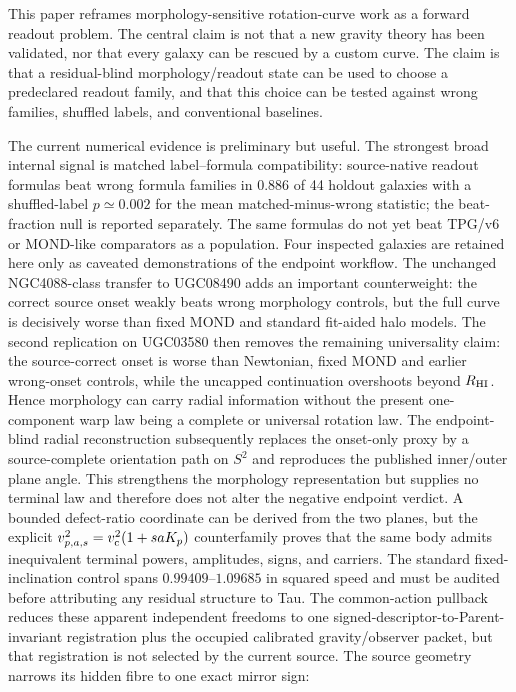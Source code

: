 \documentclass[11pt]{article}
\begin{document}
This paper reframes morphology-sensitive rotation-curve work as a forward
readout problem.  The central claim is not that a new gravity theory has been
validated, nor that every galaxy can be rescued by a custom curve.  The claim is
that a residual-blind morphology/readout state can be used to choose a
predeclared readout family, and that this choice can be tested against wrong
families, shuffled labels, and conventional baselines.

The current numerical evidence is preliminary but useful.  The strongest broad
internal signal is matched label--formula compatibility: source-native readout formulas beat wrong
formula families in \(0.886\) of 44 holdout galaxies with a shuffled-label
\(p\simeq0.002\) for the mean matched-minus-wrong statistic; the
beat-fraction null is reported separately.  The same formulas do not yet beat
TPG/v6 or MOND-like comparators as a population.  Four inspected galaxies are
retained here only as caveated demonstrations of the endpoint workflow.  The
unchanged NGC4088-class transfer to UGC08490 adds an important counterweight:
the correct source onset weakly beats wrong morphology controls, but the full
curve is decisively worse than fixed MOND and standard fit-aided halo models.
The second replication on UGC03580 then removes the remaining universality
claim: the source-correct onset is worse than Newtonian, fixed MOND and earlier
wrong-onset controls, while the uncapped continuation overshoots beyond
\(R_{\rm HI}\).  Hence morphology can carry radial information without the
present one-component warp law being a complete or universal rotation law.
The endpoint-blind radial reconstruction subsequently replaces the onset-only
proxy by a source-complete orientation path on \(S^2\) and reproduces the
published inner/outer plane angle.  This strengthens the morphology
representation but supplies no terminal law and therefore does not alter the
negative endpoint verdict.  A bounded defect-ratio coordinate can be derived
from the two planes, but the explicit
\(v_{p,a,s}^2=v_{\rm c}^2(1+s aK_p)\) counterfamily proves that the same body
admits inequivalent terminal powers, amplitudes, signs, and carriers.  The
standard fixed-inclination control spans \(0.99409\)--\(1.09685\) in squared
speed and must be audited before attributing any residual structure to Tau.
The common-action pullback reduces these apparent independent freedoms to one
signed-descriptor-to-Parent-invariant registration plus the occupied calibrated
gravity/observer packet, but that registration is not selected by the current
source.  The source geometry narrows its hidden fibre to one exact mirror sign:
\end{document}

